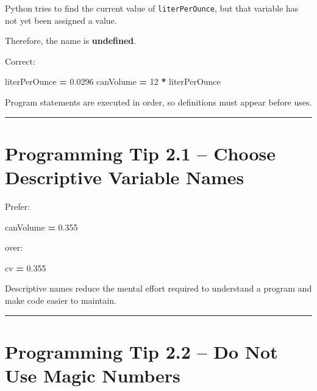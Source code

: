 \documentclass[
]{article}
\newenvironment{Shaded}{\begin{snugshade}}{\end{snugshade}}
\newcommand{\DecValTok}[1]{\textcolor[rgb]{0.00,0.00,0.81}{#1}}
\newcommand{\FloatTok}[1]{\textcolor[rgb]{0.00,0.00,0.81}{#1}}
\newcommand{\NormalTok}[1]{#1}
\newcommand{\OperatorTok}[1]{\textcolor[rgb]{0.81,0.36,0.00}{\textbf{#1}}}
\begin{document}
Python tries to find the current value of \texttt{literPerOunce}, but
that variable has not yet been assigned a value.

Therefore, the name is \textbf{undefined}.

Correct:

\begin{Shaded}
\begin{Highlighting}[]
\NormalTok{literPerOunce }\OperatorTok{=} \FloatTok{0.0296}
\NormalTok{canVolume }\OperatorTok{=} \DecValTok{12} \OperatorTok{*}\NormalTok{ literPerOunce}
\end{Highlighting}
\end{Shaded}

Program statements are executed in order, so definitions must appear
before uses.

\begin{center}\rule{0.5\linewidth}{0.5pt}\end{center}

\section{Programming Tip 2.1 -- Choose Descriptive Variable
Names}\label{programming-tip-2.1-choose-descriptive-variable-names}

Prefer:

\begin{Shaded}
\begin{Highlighting}[]
\NormalTok{canVolume }\OperatorTok{=} \FloatTok{0.355}
\end{Highlighting}
\end{Shaded}

over:

\begin{Shaded}
\begin{Highlighting}[]
\NormalTok{cv }\OperatorTok{=} \FloatTok{0.355}
\end{Highlighting}
\end{Shaded}

Descriptive names reduce the mental effort required to understand a
program and make code easier to maintain.

\begin{center}\rule{0.5\linewidth}{0.5pt}\end{center}

\section{Programming Tip 2.2 -- Do Not Use Magic
Numbers}\label{programming-tip-2.2-do-not-use-magic-numbers}
\end{document}
